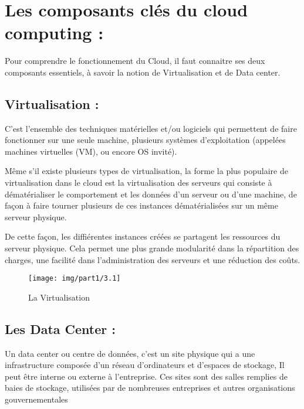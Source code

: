 \section{Les composants clés du cloud computing :}
Pour comprendre le fonctionnement du Cloud, il faut connaitre ses deux composants essentiels, à savoir la notion de Virtualisation et de Data center.

\subsection{Virtualisation :}
C'est l'ensemble des techniques matérielles et/ou logiciels qui permettent de faire fonctionner sur une seule machine, plusieurs systèmes d'exploitation (appelées machines virtuelles (VM), ou encore OS invité).

Même s'il existe plusieurs types de virtualisation, la forme la plus populaire de virtualisation dans le cloud est la virtualisation des serveurs qui consiste à dématérialiser le comportement et les données d'un serveur ou d'une machine, de façon à faire tourner plusieurs de ces instances dématérialisées sur un même serveur physique.

De cette façon, les diffiérentes instances créées se partagent les ressources du serveur physique. Cela permet une plus grande modularité dans la répartition des charges, une facilité dans l'administration des serveurs et une réduction des coûts.

\begin{figure}[h]
	\centering
	\texttt{[image: img/part1/3.1]}
	\caption{La Virtualisation}
\end{figure}

\subsection{Les Data Center :}
Un data center ou centre de données, c'est un site physique qui a une infrastructure composée d'un réseau d'ordinateurs et d'espaces de stockage, Il peut être interne ou externe à l'entreprise. Ces sites sont des salles remplies de baies de stockage, utilisées par de nombreuses entreprises et autres organisations gouvernementales

